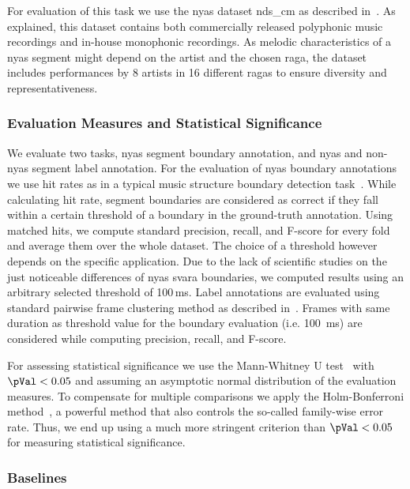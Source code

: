 {For evaluation of this task we use the \gls{nyas} dataset \acrshort{nds_cm} as described in~. As explained, this dataset contains both commercially released polyphonic music recordings and in-house monophonic recordings. As melodic characteristics of a \gls{nyas} segment might depend on the artist and the chosen \gls{raga}, the dataset includes performances by 8 artists in 16 different \glspl{raga} to ensure diversity and representativeness.

\subsubsection{Evaluation Measures and Statistical Significance}

We evaluate two tasks, \gls{nyas} segment boundary annotation, and \gls{nyas} and non-\gls{nyas} segment label annotation. For the evaluation of \gls{nyas} boundary annotations we use hit rates as in a typical music structure boundary detection task~\citep{Ong05ICMC}. While calculating hit rate, segment boundaries are considered as correct if they fall within a certain threshold of a boundary in the ground-truth annotation. Using matched hits, we compute standard precision, recall, and F-score for every fold and average them over the whole dataset. The choice of a threshold however depends on the specific application. Due to the lack of scientific studies on the just noticeable differences of \gls{nyas} \gls{svara} boundaries, we computed results using an arbitrary selected threshold of 100\,ms. Label annotations are evaluated using standard pairwise frame clustering method as described in~\cite{levy2008structural}. Frames with same duration as threshold value for the boundary evaluation (i.e. 100~ms) are considered while computing precision, recall, and F-score. 

For assessing statistical significance we use the Mann-Whitney U test~\citep{mann1947test} with $\pVal<0.05$ and assuming an asymptotic normal distribution of the evaluation measures. To compensate for multiple comparisons we apply the Holm-Bonferroni method~\citep{holm1979simple}, a powerful method that also controls the so-called family-wise error rate. Thus, we end up using a much more stringent criterion than $\pVal<0.05$ for measuring statistical significance.

\subsubsection{Baselines}

}
